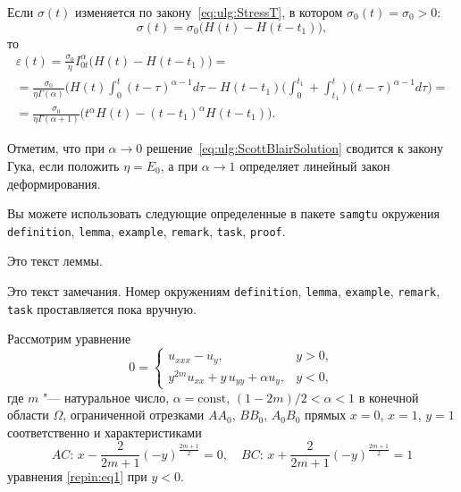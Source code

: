 Если $\sigma(t)$ изменяется по закону~\eqref{eq:ulg:StressT}, в котором $\sigma_{0}(t)=\sigma_{0}>0$:
\begin{equation}\label{eq:ulg:StressConst}
\sigma(t)=\sigma_{0}\bigl(H(t)-H(t-t_{1})\bigr),
\end{equation}
то
\begin{multline}\label{eq:ulg:ScottBlairSolution}
\varepsilon(t)=\frac{\sigma_{0}}{\eta}I_{0t}^{\alpha} \bigl( H(t)-H(t-t_{1})\bigr)
= 
\\
=\frac{\sigma_{0}}{\eta\Gamma(\alpha)} \biggl(H(t)\int _{0}^{t}(t-\tau)^{\alpha-1}d\tau
-H(t-t_{1}) \biggl(\int _{0}^{t_{1}}+\int _{t_{1}}^{t} \biggr)(t-\tau)^{\alpha-1}d\tau \biggr)=
\\
= \frac{\sigma_{0}}{\eta \Gamma (\alpha+1)} \bigl(t^{\alpha}H(t)-(t-t_{1})^{\alpha}H(t-t_{1})\bigr).
\end{multline}

Отметим, что при $\alpha\rightarrow 0$ решение~\eqref{eq:ulg:ScottBlairSolution} сводится к
закону Гука, если положить $\eta=E_{0}$, а при $\alpha\rightarrow 1$ определяет линейный
закон деформирования.

Вы можете использовать следующие определенные в пакете {\tt samgtu} окружения {\tt definition}, {\tt lemma}, {\tt example}, {\tt remark}, {\tt task}, {\tt proof}.

\begin{lemma}
Это текст леммы.
\end{lemma}

\begin{remark}[1]
Это текст замечания. Номер окружениям  {\tt definition}, {\tt lemma}, {\tt example}, {\tt remark}, {\tt task} проставляется пока вручную.
\end{remark}



Рассмотрим уравнение
\begin{equation}
       \label{repin:eq1}
0= \left\{\begin {array}{ll}
      u_{xxx}-u_{y}, & y>0,\\
      y^{2m}u_{xx}+y\,u_{yy}+\alpha u_{y}, & y<0,
\end{array} \right.
\end{equation}
где $m$ "--- натуральное число, 
$\alpha=\text{const}$, $({1-2m})/{2}<\alpha<1 $ в конечной области $\Omega$, 
ограниченной отрезками $AA_{0}$, $BB_{0}$, $A_{0}B_{0}$  прямых $x=0$, $x=1$, $y=1$ соответственно и характеристиками
\[
AC: \, x-\frac{2}{2m+1}(-y)^{\frac{2m+1}{2}}=0, \quad BC: \, x+\frac{2}{2m+1}(-y)^{\frac{2m+1}{2}}=1
\]
уравнения \eqref{repin:eq1} при $y<0$.


